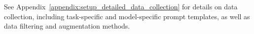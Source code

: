     See Appendix~\ref{appendix:setup_detailed_data_collection} for details on data collection, including task-specific and model-specific prompt templates, as well as data filtering and augmentation methods.
    
    
    
    
